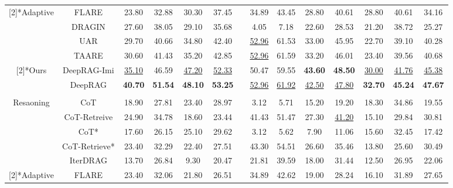 \begin{table*}[t]
{\begin{tabular}{cccccccccccccc}
    \hdashline
    \multirow{4}[2]{*}{Adaptive} & FLARE & 23.80  & 32.88  & 30.30  & 37.45  &       & 34.89  & 43.45  & 28.80  & 40.61  & 28.80  & 40.61  & 34.16  \\
          & DRAGIN & 27.60  & 38.05  & 29.10  & 35.68  &       & 4.05  & 7.18  & 22.60  & 28.53  & 21.20  & 38.72  & 25.27  \\
          & UAR & 29.70 &	40.66 &	34.80 &	42.40 	&&	\underline{52.96} &	61.53 &	33.00 &	45.95 &	22.70 &	39.10 &	40.28  \\
          & TAARE & 30.60  & 41.43  & 35.20  & 42.85  &       & \underline{52.96}  & 61.59  & 33.20  & 46.01  & 23.40  & 39.56  & 40.68  \\
    \hdashline
    \multirow{2}[2]{*}{Ours} & DeepRAG-Imi & \underline{35.10}  & 46.59  & \underline{47.20}  & \underline{52.33}  &       & 50.47  & 59.55  & \textbf{43.60}  & \textbf{48.50}  & \underline{30.00}  & \underline{41.76}  & \underline{45.38}   \\
          & DeepRAG  &  \textbf{40.70}  & \textbf{51.54}   & \textbf{48.10}  & \textbf{53.25}  &       & \underline{52.96}  & \underline{61.92}  & \underline{42.50}  & \underline{47.80}  & \textbf{32.70}  & \textbf{45.24}  & \textbf{47.67}  \\
    \midrule
    \rowcolor{gray!20}
    \multicolumn{14}{c}{\textit{Qwen-2.5-7B}} \\
    \multirow{5}[2]{*}{Resaoning} & CoT   & 18.90  & 27.81  & 23.40  & 28.97  &       & 3.12  & 5.71  & 15.20  & 19.20  & 18.30  & 34.86  & 19.55  \\
          & CoT-Retreive & 24.90  & 34.78  & 18.60  & 23.44  &       & 41.43  & 51.47  & 27.30  & \underline{41.20}  & 15.10  & 29.84  & 30.81  \\
          & CoT*  & 17.60  & 26.15  & 25.10  & 29.62  &       & 3.12  & 5.62  & 7.90  & 11.06  & 15.60  & 32.45  & 17.42  \\
          & CoT-Retrieve* & 23.40  & 32.29  & 22.40  & 27.51  &       & 43.30  & 54.51  & 26.60  & 35.46  & 13.80  & 25.60  & 30.49  \\
        & IterDRAG & 13.70  & 26.84  & 9.30  & 20.47  &       & 21.81  & 39.59  & 18.00  & 31.44  & 12.50  & 26.95  & 22.06 \\
    \hdashline
    \multirow{4}[2]{*}{Adaptive} & FLARE & 23.40  & 32.06  & 21.80  & 26.51  &       & 34.89  & 42.62  & 19.00  & 28.24  & 16.10  & 31.89  & 27.65  \\

\end{tabular}}
\end{table*}
